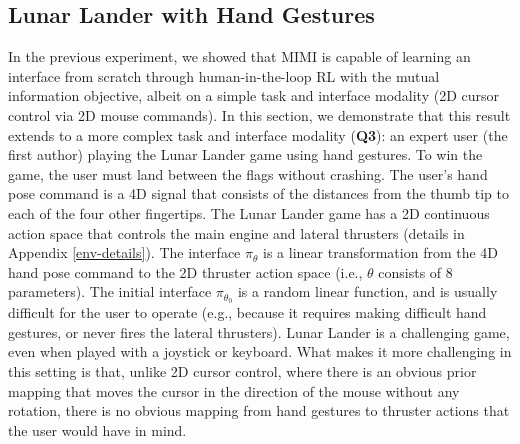 \documentclass{article}
\begin{document}
\subsection{Lunar Lander with Hand Gestures} \label{lander-demo}

In the previous experiment, we showed that MIMI is capable of learning an interface from scratch through human-in-the-loop RL with the mutual information objective, albeit on a simple task and interface modality (2D cursor control via 2D mouse commands).
In this section, we demonstrate that this result extends to a more complex task and interface modality (\textbf{Q3}): an expert user (the first author) playing the Lunar Lander game \cite{brockman2016openai} using hand gestures.
To win the game, the user must land between the flags without crashing.
The user's hand pose command is a 4D signal that consists of the distances from the thumb tip to each of the four other fingertips.
The Lunar Lander game has a 2D continuous action space that controls the main engine and lateral thrusters (details in Appendix \ref{env-details}).
The interface $\pi_{\theta}$ is a linear transformation from the 4D hand pose command to the 2D thruster action space (i.e., $\theta$ consists of 8 parameters).
The initial interface $\pi_{\theta_0}$ is a random linear function, and is usually difficult for the user to operate (e.g., because it requires making difficult hand gestures, or never fires the lateral thrusters).
Lunar Lander is a challenging game, even when played with a joystick or keyboard.
What makes it more challenging in this setting is that, unlike 2D cursor control, where there is an obvious prior mapping that moves the cursor in the direction of the mouse without any rotation, there is no obvious mapping from hand gestures to thruster actions that the user would have in mind.
\end{document}
